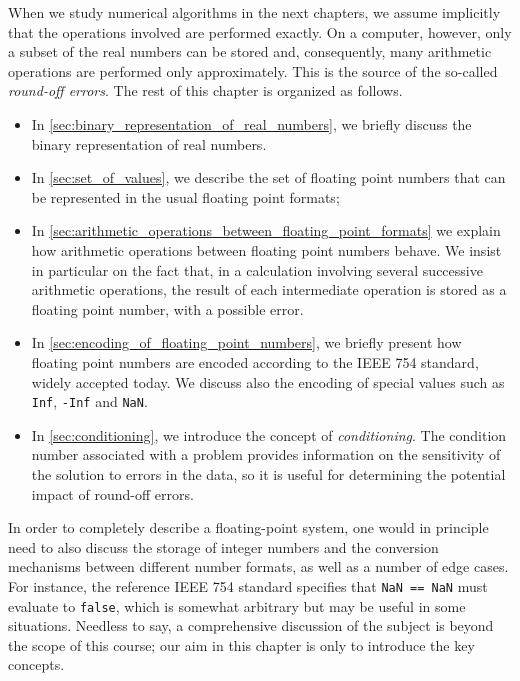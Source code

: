 When we study numerical algorithms in the next chapters,
we assume implicitly that the operations involved are performed exactly.
On a computer, however, only a subset of the real numbers can be stored and,
consequently, many arithmetic operations are performed only approximately.
This is the source of the so-called \emph{round-off errors}.
The rest of this chapter is organized as follows.
\begin{itemize}
    \item
        In \cref{sec:binary_representation_of_real_numbers},
        we briefly discuss the binary representation of real numbers.

    \item
        In \cref{sec:set_of_values},
        we describe the set of floating point numbers that can be represented in the usual floating point formats;

    \item
        In \cref{sec:arithmetic_operations_between_floating_point_formats}
        we explain how arithmetic operations between floating point numbers behave.
        We insist in particular on the fact that,
        in a calculation involving several successive arithmetic operations,
        the result of each intermediate operation is stored as a floating point number,
        with a possible error.

    \item
        In \cref{sec:encoding_of_floating_point_numbers},
        we briefly present how floating point numbers are encoded
        according to the IEEE 754 standard, widely accepted today.
        We discuss also the encoding of special values such as \texttt{Inf}, \texttt{-Inf} and \texttt{NaN}.

    \item
        In \cref{sec:conditioning},
        we introduce the concept of \emph{conditioning}.
        The condition number associated with a problem provides information on the sensitivity of the solution to errors in the data,
        so it is useful for determining the potential impact of round-off errors.
\end{itemize}
In order to completely describe a floating-point system,
one would in principle need to also discuss the storage of integer numbers
and the conversion mechanisms between different number formats,
as well as a number of edge cases.
For instance, the reference IEEE 754 standard specifies that \texttt{NaN == NaN} must evaluate to \texttt{false},
which is somewhat arbitrary but may be useful in some situations.
Needless to say,
a comprehensive discussion of the subject is beyond the scope of this course;
our aim in this chapter is only to introduce the key concepts.

